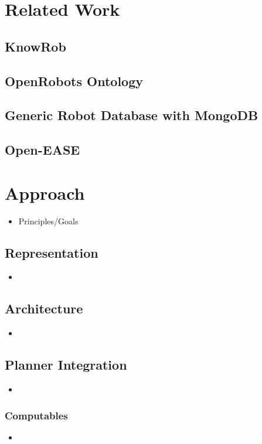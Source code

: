 \documentclass[a4paper,11pt]{article}
\begin{document}
\section{Related Work}
\subsection{KnowRob}
\subsection{OpenRobots Ontology}
\subsection{Generic Robot Database with MongoDB}
\subsection{Open-EASE}


\section{Approach}
\begin{itemize}
\item Principles/Goals
\end{itemize}
\subsection{Representation}
\begin{itemize}
\item 
\end{itemize}
\subsection{Architecture}
\begin{itemize}
\item 
\end{itemize}
\subsection{Planner Integration}
\begin{itemize}
\item 
\end{itemize}
\subsubsection{Computables}
\begin{itemize}
\item 
\end{itemize}
\end{document}
